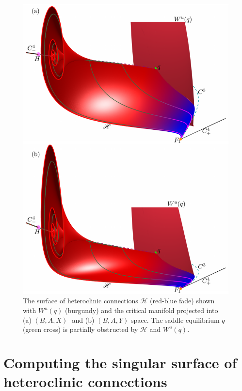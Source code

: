 \documentclass{ws-ijbc}
\begin{document}
\begin{figure}[H]
\centering
\includegraphics[]{./figures/MKMO_10.pdf}
\caption{The surface of heteroclinic connections $\mathscr{H}$ (red-blue fade) shown with $W^u(q)$ (burgundy) and the critical manifold projected into (a) $(B,A,X)$- and (b) $(B,A,Y)$-space.  The saddle equilibrium $q$ (green cross) is partially obstructed by $\mathscr{H}$ and $W^{u}(q)$.}
\label{heteroclinic}
\end{figure}




\section{Computing the singular surface of heteroclinic connections}
\end{document}
